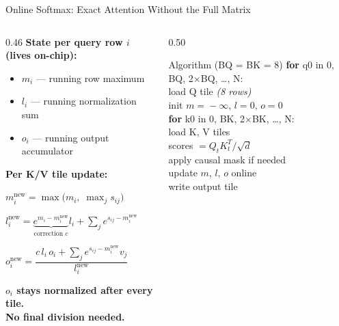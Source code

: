 \documentclass[aspectratio=169, 10pt]{beamer}
\newcommand{\good}[1]{{\color{GoodGrn}\textbf{#1}}}
\begin{document}
\begin{frame}{Online Softmax: Exact Attention Without the Full Matrix}
  \begin{columns}[T]
    \begin{column}{0.46\textwidth}
      \textbf{State per query row $i$ (lives on-chip):}
      \begin{itemize}\setlength\itemsep{2pt}
        \item $m_i$ --- running row maximum
        \item $l_i$ --- running normalization sum
        \item $o_i$ --- running output accumulator
      \end{itemize}

      \vspace{0.25cm}
      \textbf{Per K/V tile update:}
      \vspace{0.1cm}

      {\small
        $m_i^{\mathrm{new}} = \max\!\bigl(m_i,\;\max_j s_{ij}\bigr)$
        \par\vspace{4pt}
        $l_i^{\mathrm{new}} = \underbrace{e^{m_i - m_i^{\mathrm{new}}}}_{\text{correction }c}
          l_i + \textstyle\sum_j e^{s_{ij} - m_i^{\mathrm{new}}}$
        \par\vspace{4pt}
        $o_i^{\mathrm{new}} =
          \dfrac{c\,l_i\,o_i +
                 \sum_j e^{s_{ij}-m_i^{\mathrm{new}}} v_j}
                {l_i^{\mathrm{new}}}$
      }

      \vspace{0.25cm}
      \good{$o_i$ stays normalized after every tile.}\\
      \good{No final division needed.}
    \end{column}
    \begin{column}{0.50\textwidth}
      \begin{block}{Algorithm (BQ = BK = 8)}
        \vspace{2pt}
        {\ttfamily\scriptsize\color{Navy}
          \textbf{for} q0 in 0, BQ, 2$\times$BQ, \ldots, N:\\
          \quad load Q tile \hfill\textit{(8 rows)}\\
          \quad init $m\!=\!-\infty$, $l\!=\!0$, $o\!=\!0$\\[3pt]
          \quad\textbf{for} k0 in 0, BK, 2$\times$BK, \ldots, N:\\
          \quad\quad load K, V tiles\\
          \quad\quad scores $= Q_t K_t^T / \sqrt{d}$\\
          \quad\quad apply causal mask if needed\\
          \quad\quad update $m$, $l$, $o$ online\\[3pt]
          \quad write output tile
        }
        \vspace{2pt}
      \end{block}


\end{column}
\end{columns}
\end{frame}
\end{document}
